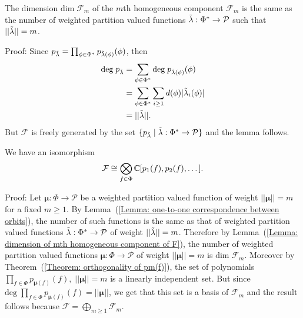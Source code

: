 \begin{dang}
    \begin{lemma}\label{Lemma: dimension of mth homogeneous component of F}
        The dimension $\text{dim}\;\mathcal{F}_m$ of the $m$th homogeneous component $\mathcal{F}_m$ is the same as the number of weighted partition valued functions $\Tilde{\lambda}: \Phi^*\rightarrow\mathcal{P}$ such that $||\Tilde{\lambda}||= m$.
        \end{lemma}
\end{dang}
Proof: Since $p_{\Tilde{\lambda}}=\prod_{\phi\in\Phi^*}p_{\Tilde{\lambda}(\phi)}(\phi)$, then
\begin{equation}
    \begin{split}
        \text{deg}\;p_{\Tilde{\lambda}} &= \sum_{\phi\in\Phi^*}\text{deg}\;p_{\Tilde{\lambda}(\phi)}(\phi)\\
        &=\sum_{\phi\in\Phi^*}\sum_{i\geq1}d(\phi)|\Tilde{\lambda}_i(\phi)|\\
        &=||\Tilde{\lambda}||.
    \end{split}
\end{equation}
But $\mathcal{F}$ is freely generated by the set $\{p_{\Tilde{\lambda}}\;|\;\Tilde{\lambda}:\Phi^*\rightarrow\mathcal{P}\}$ and the lemma follows.
\begin{dang}
    \begin{theorem}\label{Theorem: F isomorphic to the span of p(f)'s}
    We have an isomorphism 
    \begin{equation}
        \mathcal{F}\cong\bigotimes_{f\in\Phi}\mathbb{C}[p_1(f),p_2(f),\dots].
    \end{equation}
    \end{theorem}
\end{dang}
Proof: Let $\boldsymbol{\mu}:\Phi\rightarrow \mathcal{P}$ be a weighted partition valued function of weight $||\boldsymbol{\mu}||=m$ for a fixed $m\geq1$. By Lemma~(\ref{Lemma: one-to-one correspondence between orbits}), the number of such functions is the same as that of weighted partition valued functions $\Tilde{\lambda}:\Phi^*\rightarrow\mathcal{P}$ of weight $||\Tilde{\lambda}||=m$. Therefore by Lemma~(\ref{Lemma: dimension of mth homogeneous component of F}), the number of weighted partition valued functions $\boldsymbol{\mu}:\Phi\rightarrow \mathcal{P}$ of weight $||\boldsymbol{\mu}||=m$ is $\text{dim}\;\mathcal{F}_m$. Moreover by Theorem~(\ref{Theorem: orthogonality of pm(f)}), the set of polynomials $\prod_{f\in\Phi}p_{\boldsymbol{\mu}(f)}(f),\;||\boldsymbol{\mu}||=m$ is a linearly independent set. But since $\text{deg}\;\prod_{f\in\Phi}p_{\boldsymbol{\mu}(f)}(f)=||\boldsymbol{\mu}||$, we get that this set is a basis of $\mathcal{F}_m$ and the result follows because $\mathcal{F}=\bigoplus_{m\geq1}\mathcal{F}_m$.


